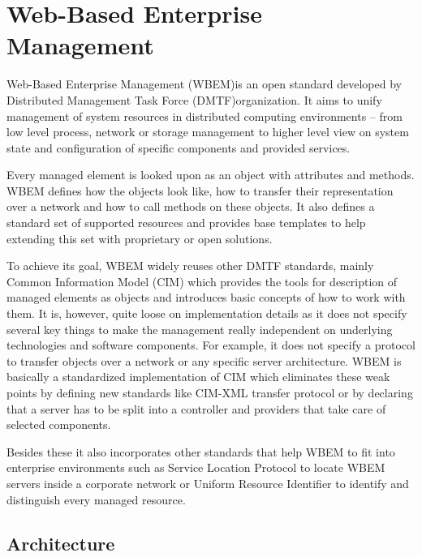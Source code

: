 \chapter{Web-Based Enterprise Management}
\label{chapter:wbem}

Web-Based Enterprise Management (WBEM)\footnotemark is an open standard
developed by Distributed Management Task Force (DMTF)\footnotemark organization.
It aims to unify management of system resources in distributed computing
environments -- from low level process, network or storage management to higher
level view on system state and configuration of specific components and
provided services.

Every managed element is looked upon as an object with attributes and methods.
WBEM defines how the objects look like, how to transfer their representation
over a network and how to call methods on these objects. It also defines a
standard set of supported resources and provides base templates to help
extending this set with proprietary or open solutions.

To achieve its goal, WBEM widely reuses other DMTF standards, mainly Common
Information Model (CIM) which provides the tools for description of managed
elements as objects and introduces basic concepts of how to work with them. It
is, however, quite loose on implementation details as it does not specify
several key things to make the management really independent on underlying
technologies and software components. For example, it does not specify a
protocol to transfer objects over a network or any specific server architecture.
WBEM is basically a standardized implementation of CIM which eliminates these
weak points by defining new standards like CIM-XML transfer protocol or by
declaring that a server has to be split into a controller and providers that
take care of selected components.

Besides these it also incorporates other standards that help WBEM to fit into
enterprise environments such as Service Location Protocol to locate WBEM servers
inside a corporate network or Uniform Resource Identifier to identify and
distinguish every managed resource.


\section{Architecture}
\label{wbem:architecture}

